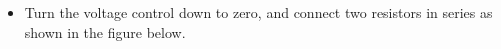 \begin{itemize}




\item Turn the voltage control down to zero, and connect two resistors in 
series as shown in the figure below.
\end{itemize}
\vspace{0.3cm}
{\centering {} \par}
\vspace{0.3cm}

